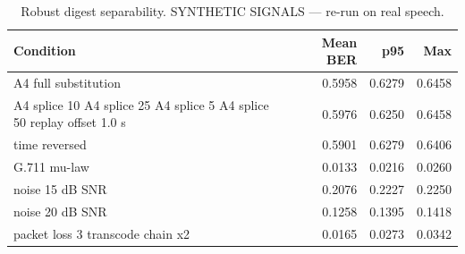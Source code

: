 \begin{table}[t]
\centering
\caption{Robust digest separability. SYNTHETIC SIGNALS — re-run on real speech.}
\label{tab:digest}
\begin{tabular}{lrrr}
\toprule
Condition & Mean BER & p95 & Max \\
\midrule
\quad A4 full substitution & 0.5958 & 0.6279 & 0.6458 \\
\quad A4 splice 10%
\quad A4 splice 25%
\quad A4 splice 5%
\quad A4 splice 50%
\quad replay offset 1.0 s & 0.5976 & 0.6250 & 0.6458 \\
\quad time reversed & 0.5901 & 0.6279 & 0.6406 \\
\quad G.711 mu-law & 0.0133 & 0.0216 & 0.0260 \\
\quad noise 15 dB SNR & 0.2076 & 0.2227 & 0.2250 \\
\quad noise 20 dB SNR & 0.1258 & 0.1395 & 0.1418 \\
\quad packet loss 3%
\quad transcode chain x2 & 0.0165 & 0.0273 & 0.0342 \\
\bottomrule
\end{tabular}
\end{table}